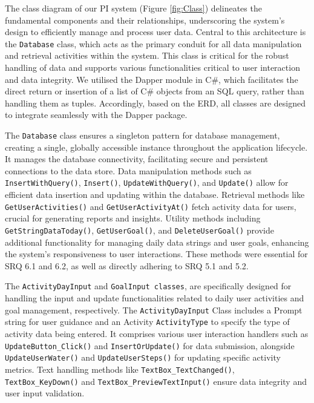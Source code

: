 \documentclass[11pt]{article}
\begin{document}
The class diagram of our PI system (Figure \ref{fig:Class}) delineates the
fundamental components and their relationships, underscoring the system's
design to efficiently manage and process user data. Central to this
architecture is the \texttt{Database} class, which acts as the primary conduit for all
data manipulation and retrieval activities within the system. This class is
critical for the robust handling of data and supports various functionalities
critical to user interaction and data integrity. We utilised the Dapper module 
in C\#, which facilitates the direct return or insertion of a list of 
C\# objects from an SQL query, rather than handling them as tuples. 
Accordingly, based on the ERD, all classes are designed to integrate seamlessly
with the Dapper package.\par

\newpage

The \texttt{Database} class ensures a singleton pattern for database management,
creating a single, globally accessible instance throughout the application
lifecycle. It manages the database connectivity, facilitating secure and
persistent connections to the data store. Data manipulation methods such as
\texttt{InsertWithQuery()}, \texttt{Insert()}, \texttt{UpdateWithQuery()}, and \texttt{Update()} allow for
efficient data insertion and updating within the database. Retrieval methods
like \texttt{GetUserActivities()} and \texttt{GetUserActivityAt()} fetch activity data for users,
crucial for generating reports and insights. Utility methods including
\texttt{GetStringDataToday()}, \texttt{GetUserGoal()}, and \texttt{DeleteUserGoal()} provide additional
functionality for managing daily data strings and user goals, enhancing the
system’s responsiveness to user interactions. These methods were essential for
SRQ 6.1 and 6.2, as well as directly adhering to SRQ 5.1 and 5.2. \par

The \texttt{ActivityDayInput} and \texttt{GoalInput classes}, are specifically
designed for handling the input and update functionalities related to daily
user activities and goal management, respectively. The
\texttt{ActivityDayInput} Class includes a Prompt string for user guidance and
an Activity \texttt{ActivityType} to specify the type of activity data being
entered. It comprises various user interaction handlers such as
\texttt{UpdateButton\_Click()} and \texttt{InsertOrUpdate()} for data
submission, alongside \texttt{UpdateUserWater()} and \texttt{UpdateUserSteps()}
for updating specific activity metrics. Text handling methods like
\texttt{TextBox\_TextChanged()}, \texttt{TextBox\_KeyDown()} and
\texttt{TextBox\_PreviewTextInput()} ensure data integrity and user input
validation.\par
\end{document}
